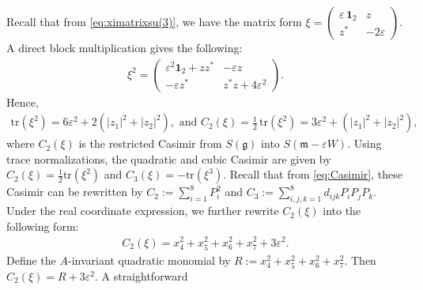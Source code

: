 \documentclass[11pt]{amsart}
\theoremstyle{definition}
\theoremstyle{plain}
\theoremstyle{conclusion}
\begin{document}
Recall that from \eqref{eq:ximatrixsu(3)}, we have the matrix form $\xi=\begin{pmatrix}\varepsilon\,\mathbf{1}_2 & z\\[2pt] 
z^* & -2\varepsilon\end{pmatrix}$. A direct block multiplication gives the following: \begin{align*}
\xi^2=\begin{pmatrix}\varepsilon^2\mathbf{1}_2+zz^* & - \varepsilon z\\[2pt]
- \varepsilon z^* & z^*z+4\varepsilon^2\end{pmatrix}.
\end{align*} Hence, \begin{align*}
\mathrm{tr}(\xi^2)=6\varepsilon^2+2\left(|z_1|^2  + |z_2|^2\right), \text{ and } C_2(\xi)=\frac{1}{2}\,\mathrm{tr}(\xi^2)=3\varepsilon^2+\left(|z_1|^2  + |z_2|^2\right),
\end{align*} where $C_2(\xi)$ is the restricted Casimir from $S(\mathfrak{g})$ into $S(\mathfrak{m}-\varepsilon W)$. Using trace normalizations, the quadratic and cubic Casimir are given by $C_2(\xi) = \frac{1}{2} \mathrm{tr}(\xi^2)$ and $C_3(\xi) = - \mathrm{tr}(\xi^3)$. Recall that from \eqref{eq:Casimir},  these Casimir can be rewritten by $  C_2:=\sum_{i=1}^8P_i^2$ and   $C_3:=\sum_{i,j,k=1}^8d_{ijk}P_iP_jP_k$. Under the real coordinate expression, we further rewrite $C_2(\xi)$ into the following form: \begin{align*}
 C_2(\xi)=x_4^2+x_5^2+x_6^2+x_7^2+3\varepsilon^2.
\end{align*} Define the $A$-invariant quadratic monomial by $R:=x_4^2+x_5^2+x_6^2+x_7^2$. Then $C_2(\xi)=R+3\varepsilon^2$.  A straightforward %
\end{document}
